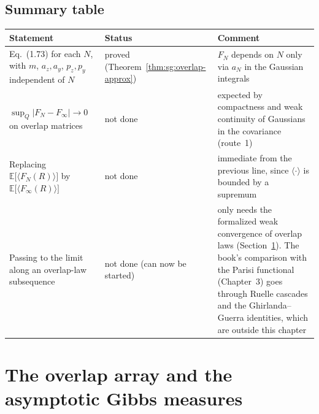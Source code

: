 \subsection*{Summary table}

\begin{center}
\begin{tabular}{p{}p{}p{}}
\textbf{Statement} & \textbf{Status} & \textbf{Comment}\\ \hline
Eq.~(1.73) for each $N$, with $m$, $a_z,a_y$, $p_z,p_y$ independent of $N$ & proved (Theorem~\ref{thm:sg:overlap-approx}) & $F_N$ depends on $N$ only via $a_N$ in the Gaussian integrals\\
$\sup_Q|F_N-F_\infty|\to0$ on overlap matrices & not done & expected by compactness and weak continuity of Gaussians in the covariance (route~1)\\
Replacing $\mathbb E\big[\langle F_N(R)\rangle\big]$ by $\mathbb E\big[\langle F_\infty(R)\rangle\big]$ & not done & immediate from the previous line, since $\langle\cdot\rangle$ is bounded by a supremum\\
Passing to the limit along an overlap-law subsequence & not done (can now be started) & only needs the formalized weak convergence of overlap laws (Section~\ref{sec:sg:asymptotic-gibbs}). The book's comparison with the Parisi functional (Chapter~3) goes through Ruelle cascades and the Ghirlanda--Guerra identities, which are outside this chapter\\
\end{tabular}
\end{center}

\section{The overlap array and the asymptotic Gibbs measures}\label{sec:sg:asymptotic-gibbs}

